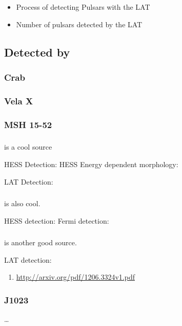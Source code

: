 \begin{itemize}
  \item Process of detecting Pulsars with the \ac{LAT}
  \item Number of pulsars detected by the \ac{LAT}
\end{itemize}

\subsection{ Detected by }

\subsubsection{Crab}

\subsubsection{Vela X}

\subsubsection{MSH 15-52}


\subsubsection{}

 is a cool source

HESS Detection: 
HESS Energy dependent morphology: \cite{aharonian_2006a_energy-dependent}

LAT Detection: \cite{grondin_2011_detection-pulsar}



\subsubsection{}

 is also cool.

HESS detection:  \cite{aharonian_2006a_h.e.s.s.-survey}
Fermi detection: \cite{slane_2010_fermi-detection}

\subsubsection{}

 is another good source.

LAT detection: \cite{rousseau_2012_fermi-lat-constraints}

\begin{enumerate}
  \item \url{http://arxiv.org/pdf/1206.3324v1.pdf}
\end{enumerate}

\subsubsection{J1023}

\ldots
